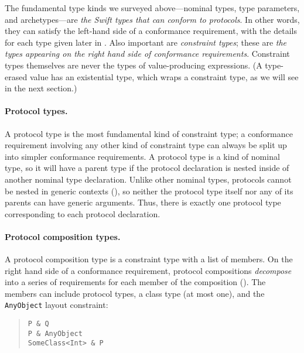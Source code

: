 \documentclass[../generics]{subfiles}
\begin{document}
The fundamental type kinds we surveyed above---nominal types, type parameters, and archetypes---are \textsl{the Swift types that can conform to protocols}. In other words, they can satisfy the left-hand side of a conformance requirement, with the details for each type given later in . Also important are \emph{constraint types}; these are \textsl{the types appearing on the right hand side of conformance requirements}. Constraint types themselves are never the types of value-producing expressions. (A type-erased value has an existential type, which wraps a constraint type, as we will see in the next section.)

\paragraph{Protocol types.}
A protocol type is the most fundamental kind of constraint type; a conformance requirement involving any other kind of constraint type can always be split up into simpler conformance requirements. A protocol type is a kind of nominal type, so it will have a parent type if the protocol declaration is nested inside of another nominal type declaration. Unlike other nominal types, protocols cannot be nested in generic contexts (), so neither the protocol type itself nor any of its parents can have generic arguments. Thus, there is exactly one protocol type corresponding to each protocol declaration.

\paragraph{Protocol composition types.}
A protocol composition type is a constraint type with a list of members. On the right hand side of a conformance requirement, protocol compositions \emph{decompose} into a series of requirements for each member of the composition (). The members can include protocol types, a class type (at most one), and the \texttt{AnyObject} layout constraint:
\begin{quote}
\begin{verbatim}
P & Q
P & AnyObject
SomeClass<Int> & P
\end{verbatim}
\end{quote}
\end{document}
